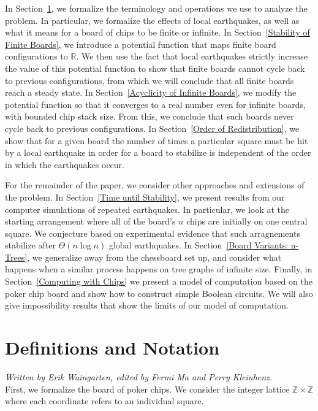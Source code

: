 \documentclass[runningheads,a4paper]{llncs}
\begin{document}
In Section~\ref{Definitions and Notation}, we formalize the terminology and operations we use to analyze the problem. In particular, we formalize the effects of local earthquakes, as well as what it means for a board of chips to be finite or infinite. 
In Section~\ref{Stability of Finite Boards}, we introduce a potential function that maps finite board configurations to $\mathbb{R}$. 
We then use the fact that local earthquakes strictly increase the value of this potential function to show that finite boards cannot cycle back to previous configurations, from which we will conclude that all finite boards reach a steady state. 
In Section~\ref{Acyclicity of Infinite Boards}, we modify the potential function so that it converges to a real number even for infinite boards, with bounded chip stack size. 
From this, we conclude that such boards never cycle back to previous configurations. 
In Section~\ref{Order of Redistribution}, we show that for a given board the number of times a particular square must be hit by a local earthquake in order for a board to stabilize is independent of the order in which the earthquakes occur. 

For the remainder of the paper, we consider other approaches and extensions of the problem. 
In  Section~\ref{Time until Stability}, we present results from our computer simulations of repeated earthquakes. In particular, we look at the starting arrangement where all of the board's $n$ chips are initially on one central square.
We conjecture based on experimental evidence that such arragnements stabilize after $\Theta(n \log n)$ global earthquakes. 
In Section~\ref{Board Variants: n-Trees}, we generalize away from the chessboard set up, and consider what happens when a similar process happens on tree graphs of infinite size. 
Finally, in Section~\ref{Computing with Chips} we present a model of computation based on the poker chip board and show how to construct simple Boolean circuits. We will also give impossibility results that show the limits of our model of computation.
\section{Definitions and Notation}
\label{Definitions and Notation}

\emph{Written by Erik Waingarten, edited by Fermi Ma and Perry Kleinhenz.}\\

First, we formalize the board of poker chips. We consider the integer lattice $\mathbb{Z} \times \mathbb{Z}$ where each coordinate refers to an individual square.
\end{document}
